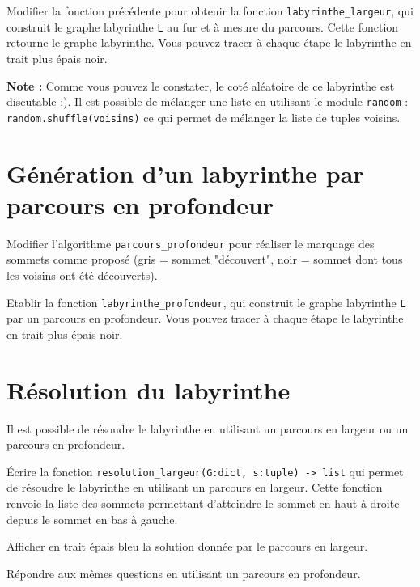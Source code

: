 \begin{question}
Modifier la fonction précédente pour obtenir la fonction \lstinline{labyrinthe_largeur}, qui construit le graphe labyrinthe \lstinline{L} au fur et à mesure du parcours. Cette fonction retourne le graphe labyrinthe. Vous pouvez tracer à chaque étape le labyrinthe en trait plus épais noir. 
\end{question}

\textbf{Note :} Comme vous pouvez le constater, le coté aléatoire de ce labyrinthe est discutable :). Il est possible de mélanger une liste en utilisant le module \lstinline{random} : \lstinline{random.shuffle(voisins)} ce qui permet de mélanger la liste de tuples voisins.

\section*{Génération d'un labyrinthe par parcours en profondeur}
\begin{question}
Modifier l'algorithme \lstinline{parcours_profondeur}  pour réaliser le marquage des sommets comme proposé (gris = sommet "découvert", noir = sommet dont tous les voisins ont été découverts).
\end{question}

\begin{question}
Etablir la fonction \lstinline{labyrinthe_profondeur}, qui construit le graphe labyrinthe \lstinline{L} par un parcours en profondeur. Vous pouvez tracer à chaque étape le labyrinthe en trait plus épais noir. 
\end{question}

\section*{Résolution du labyrinthe}

Il est possible de résoudre le labyrinthe en utilisant un parcours en largeur ou un parcours en profondeur.

\begin{question} Écrire la fonction \lstinline{resolution_largeur(G:dict, s:tuple) -> list} qui permet de résoudre le labyrinthe en utilisant un parcours en largeur. Cette fonction renvoie la liste des sommets permettant d’atteindre le sommet en haut à droite depuis le sommet en bas à gauche.
\end{question}

\begin{question}
Afficher en trait épais bleu la solution donnée par le parcours en largeur.
\end{question}

\begin{question}
Répondre aux mêmes questions en utilisant un parcours en profondeur.
\end{question}


